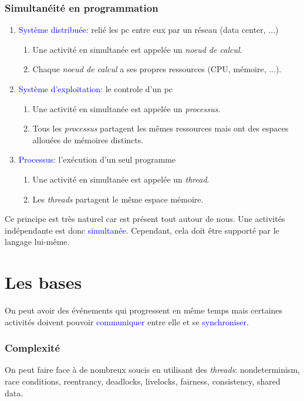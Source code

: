 \documentclass{report}
\begin{document}
\subsubsection{Simultanéité en programmation}
\noindent
\begin{enumerate}
\item \textcolor{blue}{Système distribuée}: relié les pc entre eux par un réseau (data center, ...)
	\begin{enumerate}
	\item Une activité en simultanée est appelée un \textit{noeud de calcul}.
	\item Chaque \textit{noeud de calcul} a ses propres ressources (CPU, mémoire, ...).
	\end{enumerate}
\item \textcolor{blue}{Système d'exploitation}: le controle d'un pc
	\begin{enumerate}
	\item Une activité en simultanée est appelée un \textit{processus}.
	\item Tous les \textit{processus} partagent les mêmes ressources mais ont des espaces allouées de mémoires distincts.
	\end{enumerate}
\item \textcolor{blue}{Processus}: l'exécution d'un seul programme
	\begin{enumerate}
	\item Une activité en simultanée est appelée un \textit{thread}.
	\item Les \textit{threads} partagent le même espace mémoire.
	\end{enumerate}
\end{enumerate}
Ce principe est très naturel car est présent tout autour de nous. Une activités indépendante est donc \textcolor{blue}{simultanée}. Cependant, cela doit être supporté par le langage lui-même.

\section{Les bases}
On peut avoir des événements qui progressent en même temps mais certaines activités doivent pouvoir \textcolor{blue}{communiquer} entre elle et se \textcolor{blue}{synchroniser}.

\subsubsection{Complexité}
On peut faire face à de nombreux soucis en utilisant des \textit{threads}: nondeterminism, race conditions, reentrancy, deadlocks, livelocks, fairness, consistency, shared data.\\
\end{document}
